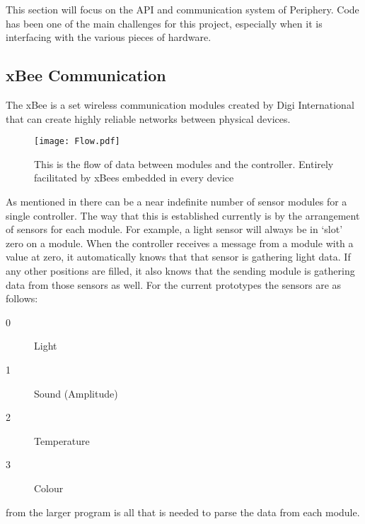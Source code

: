 
This section will focus on the API and communication system of Periphery. Code has been one of the main challenges for this project, especially when it is interfacing with the various pieces of hardware.

\subsection{xBee Communication}\label{subsec:xbee-comms}

The xBee is a set wireless communication modules created by Digi International that can create highly reliable networks between physical devices.

\begin{figure}
  \texttt{[image: Flow.pdf]}
  \caption{This is the flow of data between modules and the controller. Entirely facilitated by xBees embedded in every device}
  \label{fig:xbeecomms}
\end{figure}

As mentioned in  there can be a near indefinite number of sensor modules for a single controller. The way that this is established currently is by the arrangement of sensors for each module. For example, a light sensor will always be in `slot' zero on a module. When the controller receives a message from a module with a value at zero, it automatically knows that that sensor is gathering light data. If any other positions are filled, it also knows that the sending module is gathering data from those sensors as well. For the current prototypes the sensors are as follows: 

\begin{description}
  \item[0] Light
  \item[1] Sound (Amplitude)
  \item[2] Temperature
  \item[3] Colour
\end{description}

 from the larger program is all that is needed to parse the data from each module.

